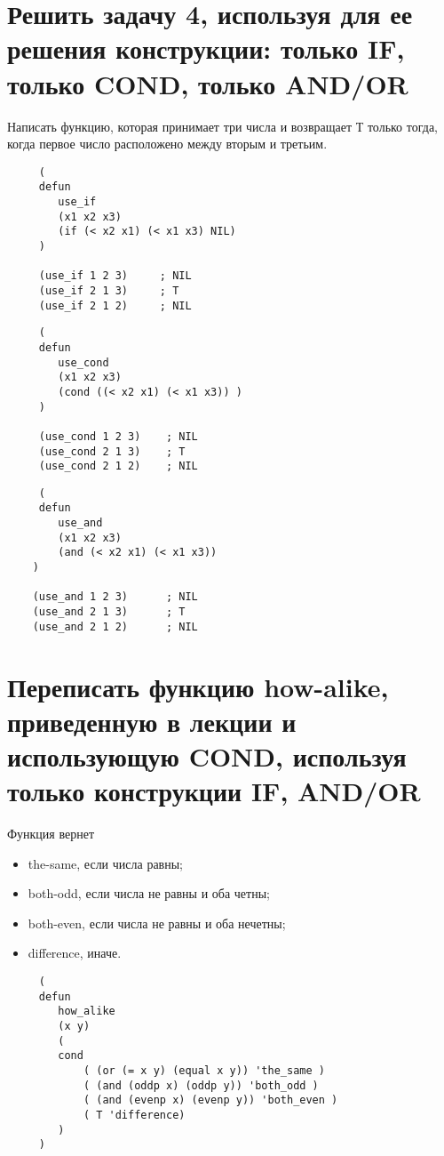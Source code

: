 \section{Решить задачу 4, используя для ее решения конструкции:
только IF, только COND, только AND/OR}

Написать функцию, которая принимает три числа и возвращает Т только тогда, когда первое число расположено между вторым и третьим.

\begin{lstlisting}
     (
     defun
        use_if
        (x1 x2 x3)
        (if (< x2 x1) (< x1 x3) NIL)
     )

     (use_if 1 2 3)     ; NIL
     (use_if 2 1 3)     ; T
     (use_if 2 1 2)     ; NIL
\end{lstlisting}

\begin{lstlisting}
     (
     defun
        use_cond
        (x1 x2 x3)
        (cond ((< x2 x1) (< x1 x3)) )
     )

     (use_cond 1 2 3)    ; NIL
     (use_cond 2 1 3)    ; T
     (use_cond 2 1 2)    ; NIL
\end{lstlisting}

\begin{lstlisting}
     (
     defun
        use_and
        (x1 x2 x3)
        (and (< x2 x1) (< x1 x3))
    )

    (use_and 1 2 3)      ; NIL
    (use_and 2 1 3)      ; T
    (use_and 2 1 2)      ; NIL
\end{lstlisting}


\section{Переписать функцию how-alike, приведенную в лекции и использующую COND, используя только конструкции IF, AND/OR}

Функция вернет 
\begin{itemize}
    \item the-same, если числа равны;
    \item both-odd, если числа не равны и оба четны;
    \item both-even, если числа не равны и оба нечетны;
    \item difference, иначе.
\end{itemize}

\begin{lstlisting}
     (
     defun
        how_alike 
        (x y) 
        (
        cond 
            ( (or (= x y) (equal x y)) 'the_same )
            ( (and (oddp x) (oddp y)) 'both_odd )
            ( (and (evenp x) (evenp y)) 'both_even )
            ( T 'difference) 
        )
     )
\end{lstlisting}

